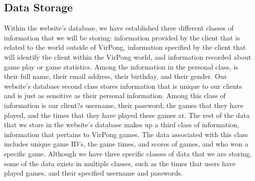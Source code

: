 %

	\subsection{Data Storage}
		Within the website's database, we have established three different classes of information that we will be storing: information provided by the client that is related to the world outside of VirPong, information specified by the client that will identify the client within the VirPong world, and information recorded about game play or game statistics. Among the information in the personal class, is their full name, their email address, their birthday, and their gender. Our website's database second class stores information that is unique to our clients and is just as sensitive as their personal information. Among this class of information is our client?s username, their password, the games that they have played, and the times that they have played these games at. The rest of the data that we store in the website's database makes up a third class of information, information that pertains to VirPong games. The data associated with this class includes unique game ID's, the game times, and scores of games, and who won a specific game. Although we have three specific classes of data that we are storing, some of the data exists in multiple classes, such as the times that users have played games, and their specified username and passwords.


